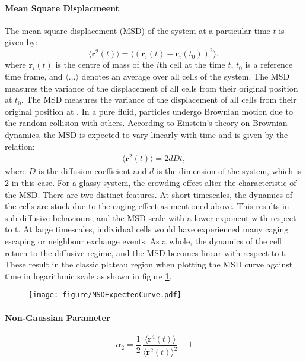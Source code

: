 \documentclass[a4paper,12pt]{article}
\begin{document}
\paragraph{Mean Square Displacmeent}
The mean square displacement (MSD) of the system at a particular time $t$ is given by:
\begin{equation}
\langle{\bm{r}^2(t)\rangle} = \langle{\left(\bm{r}_i(t) - \bm{r}_i(t_0)\right)^2\rangle},
\end{equation}
where $\bm{r}_i (t)$ is the centre of mass of the $i$th cell at the time $t$, $t_0$ is a reference time frame, and $\langle...\rangle$ denotes an average over all cells of the system. The MSD measures the variance of the displacement of all cells from their original position at $t_0$. The MSD measures the variance of the displacement of all cells from their original position at . In a pure fluid, particles undergo Brownian motion due to the random collision with others. According to Einstein's theory on Brownian dynamics, the MSD is expected to vary linearly with time and is given by the relation:
\begin{eqnarray}
\langle\bm{r}^2(t)\rangle = 2dDt, 
\end{eqnarray}
where $D$ is the diffusion coefficient and $d$ is the dimension of the system, which is 2 in this case. For a glassy system, the crowding effect alter the characteristic of the MSD. There are two distinct features. At short timescales, the dynamics of the cells are stuck due to the caging effect as mentioned above. This results in sub-diffusive behaviours, and the MSD scale with a lower exponent with respect to t. At large timescales, individual cells would have experienced many caging escaping or neighbour exchange events. As a whole, the dynamics of the cell return to the diffusive regime, and the MSD becomes linear with respect to t. These result in the classic plateau region when plotting the MSD curve against time in logarithmic scale as shown in figure \ref{fig:MSDExpectedCurve}. 
\begin{figure}[h]
\centering
\texttt{[image: figure/MSDExpectedCurve.pdf]}
\caption{}
\label{fig:MSDExpectedCurve}
\end{figure}

\paragraph{Non-Gaussian Parameter}

\begin{equation}
\alpha_2 = \frac{1}{2}\,\frac{\langle{\bm{r}^4(t)\rangle}}{\langle{\bm{r}^2(t)\rangle}^2} - 1
\end{equation}
\end{document}

